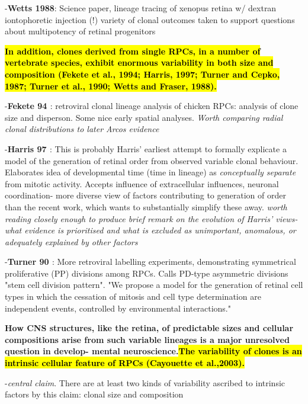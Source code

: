 \documentclass{ut-thesis}
\begin{document}
-\textbf{Wetts 1988\cite{Wetts1988}}: Science paper, lineage tracing of xenopus retina w/ dextran iontophoretic injection (!) variety of clonal outcomes taken to support questions about multipotency of retinal progenitors

\bigskip
	\textbf{\hl{In addition, clones derived from single RPCs, in a number of vertebrate species,
exhibit enormous variability in both size and composition (Fekete
et al., 1994; Harris, 1997; Turner and Cepko, 1987; Turner et al.,
1990; Wetts and Fraser, 1988).} }

\bigskip

-\textbf{Fekete 94 \cite{Fekete1994}}: retroviral clonal lineage analysis of chicken RPCs: analysis of clone size and disperson. Some nice early spatial analyses. \textit{Worth comparing radial clonal distributions to later Arcos evidence}

-\textbf{Harris 97 \cite{Harris1997}}: This is probably Harris' earliest attempt to formally explicate a model of the generation of retinal order from observed variable clonal behaviour. Elaborates idea of developmental time (time in lineage) as \textit{conceptually separate} from mitotic activity. Accepts influence of extracellular influences, neuronal coordination- more diverse view of factors contributing to generation of order than the recent work, which wants to substantially simplify these away. \textit{worth reading closely enough to produce brief remark on the evolution of Harris' views- what evidence is prioritised and what is excluded as unimportant, anomalous, or adequately explained by other factors}

-\textbf{Turner 90 \cite{Turner1990}}: More retroviral labelling experiments, demonstrating symmetrical proliferative (PP) divisions among RPCs. Calls PD-type asymmetric divisions "stem cell division pattern". "We propose a model for the generation of retinal cell types in which the cessation of mitosis and cell type determination are independent events, controlled by environmental interactions."

\bigskip
\textbf{How CNS structures, like the
retina, of predictable sizes and cellular compositions arise from
such variable lineages is a major unresolved question in develop-
mental neuroscience.\hl{The variability of clones is an intrinsic cellular feature of RPCs
(Cayouette et al.,2003).}}

\bigskip
-\textit{central claim}. There are at least two kinds of variability ascribed to intrinsic factors by this claim: clonal size and composition
\end{document}
